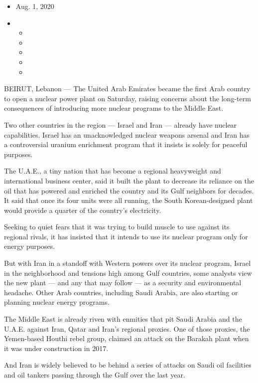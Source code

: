 \begin{itemize}
\item
  Aug. 1, 2020
\item
  \begin{itemize}
  \item
  \item
  \item
  \item
  \item
  \end{itemize}
\end{itemize}

BEIRUT, Lebanon --- The United Arab Emirates became the first Arab
country to open a nuclear power plant on Saturday, raising concerns
about the long-term consequences of introducing more nuclear programs to
the Middle East.

Two other countries in the region --- Israel and Iran --- already have
nuclear capabilities. Israel has an unacknowledged nuclear weapons
arsenal and Iran has a controversial uranium enrichment program that it
insists is solely for peaceful purposes.

The U.A.E., a tiny nation that has become a regional heavyweight and
international business center, said it built the plant to decrease its
reliance on the oil that has powered and enriched the country and its
Gulf neighbors for decades. It said that once its four units were all
running, the South Korean-designed plant would provide a quarter of the
country's electricity.

Seeking to quiet fears that it was trying to build muscle to use against
its regional rivals, it has insisted that it intends to use its nuclear
program only for energy purposes.

But with Iran in a standoff with Western powers over its nuclear
program, Israel in the neighborhood and tensions high among Gulf
countries, some analysts view the new plant --- and any that may follow
--- as a security and environmental headache. Other Arab countries,
including Saudi Arabia, are also starting or planning nuclear energy
programs.

The Middle East is already riven with enmities that pit Saudi Arabia and
the U.A.E. against Iran, Qatar and Iran's regional proxies. One of those
proxies, the Yemen-based Houthi rebel group, claimed an attack on the
Barakah plant when it was under construction in 2017.

And Iran is widely believed to be behind a series of attacks on Saudi
oil facilities and oil tankers passing through the Gulf over the last
year.

